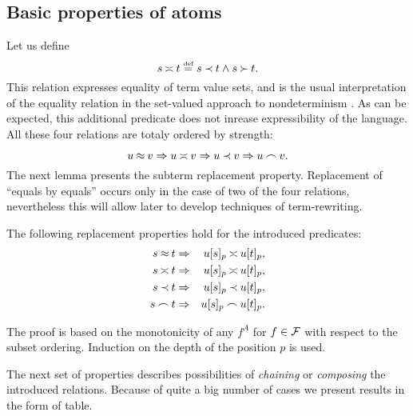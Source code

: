 \subsection{Basic properties of atoms}

Let us define
\begin{equation} \label{eq:Seteq-definition}
s\mathbin{\asymp} t\mathrel{\stackrel{\mbox{\tiny def}}{=}} s\mathbin{\prec} t\land s\mathbin{\succ} t.
\end{equation}
This relation expresses equality of term value sets, and is the usual
 interpretation of the equality relation
 in the set-valued approach to nondeterminism \cite{PS1,Kap}. 
As can be expected, this additional predicate does not inrease 
expressibility of the language.  
All these four relations are totaly ordered by strength:

\begin{equation} \label{eq:rel-order}
u\mathbin{\approx} v \mathrel\Rightarrow u \mathbin{\asymp} v \mathrel\Rightarrow u\mathbin{\prec} v \mathrel\Rightarrow u\mathbin{\frown} v. 
\end{equation}
 The next lemma presents the subterm replacement property. Replacement of
``equals by equals'' occurs only in the case of two of the four relations,
nevertheless this will allow later to develop techniques of term-rewriting. 

\begin{LEMMA} \label{le:replacement}
The following replacement properties hold for the introduced predicates:
\begin{eqnarray}
s\mathbin{\approx} t & \mathrel\Rightarrow &  u[s]_p \mathbin{\asymp}  u[t]_p, \label{eq:eq-subst}\\
s\mathbin{\asymp} t & \mathrel\Rightarrow & u[s]_p \mathbin{\asymp}  u[t]_p, \label{eq:seteq-subst}\\
s\mathbin{\prec} t & \mathrel\Rightarrow & u[s]_p \mathbin{\prec}  u[t]_p, \label{eq:incl-subst}\\
s\mathbin{\frown} t & \mathrel\Rightarrow & u[s]_p \mathbin{\frown}  u[t]_p. \label{eq:int-subst}
\end{eqnarray}
\end{LEMMA}
\begin{PROOF} The proof is based on the monotonicity of any \(f^A\) for \(f\in
{\cal F}\) with respect to the subset ordering. Induction on the depth of the
position $p$ is used. 
\end{PROOF}

The next set of properties describes possibilities of {\em chaining} or {\em
composing} the introduced relations.  Because of quite a big number of cases we
present results in the form of table. 

